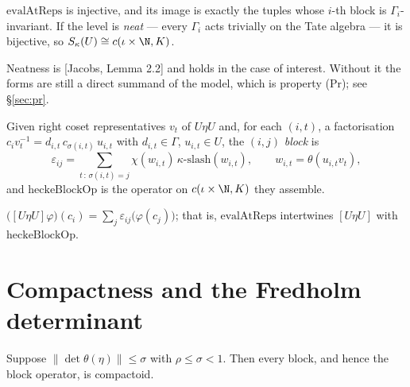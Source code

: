 \begin{theorem}
  \label{thm:evalatreps}
  \leanok
  $\mathrm{evalAtReps}$ is injective, and its image is exactly the tuples whose $i$-th block is
  $\Gamma_i$-invariant.  If the level is \emph{neat} --- every $\Gamma_i$ acts trivially on the
  Tate algebra --- it is bijective, so $S_\kappa(U) \cong c(\iota \times \N, K)$.
\end{theorem}

Neatness is [Jacobs, Lemma 2.2] and holds in the case of interest.  Without it the forms are
still a direct summand of the model, which is property (Pr); see \S\ref{sec:pr}.

\begin{definition}
  \label{def:heckeblock}
  \leanok
  Given right coset representatives $v_t$ of $U\eta U$ and, for each $(i,t)$, a factorisation
  $c_i v_t^{-1} = d_{i,t}\, c_{\sigma(i,t)}\, u_{i,t}$ with $d_{i,t} \in \Gamma$, $u_{i,t} \in
  U$, the $(i,j)$ \emph{block} is
  \[
    \varepsilon_{ij} = \sum_{t \,:\, \sigma(i,t) = j} \chi(w_{i,t})\,
    \kappa\text{-}\mathrm{slash}(w_{i,t}), \qquad w_{i,t} = \theta(u_{i,t} v_t),
  \]
  and $\mathrm{heckeBlockOp}$ is the operator on $c(\iota \times \N, K)$ they assemble.
\end{definition}

\begin{theorem}
  \label{thm:transport}
  \leanok
  $\bigl([U\eta U]\varphi\bigr)(c_i) = \sum_j \varepsilon_{ij}\bigl(\varphi(c_j)\bigr)$; that is,
  $\mathrm{evalAtReps}$ intertwines $[U\eta U]$ with $\mathrm{heckeBlockOp}$.
\end{theorem}

\section{Compactness and the Fredholm determinant}

\begin{theorem}
  \label{thm:qmf-compact}
  \leanok
  Suppose $\lVert \det \theta(\eta) \rVert \leq \sigma$ with $\rho \leq \sigma < 1$.  Then every
  block, and hence the block operator, is compactoid.
\end{theorem}

